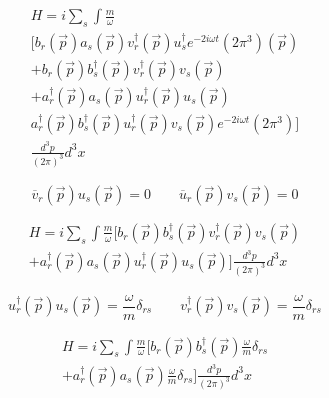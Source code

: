 \documentclass[a4]{article}
\begin{document}
    \begin{equation}
        \begin{aligned}
            H = i \sum_{s} \int \frac{m}{\omega} \\
        [b_r (\vec{p}) a_s (\vec{p}) v_r^{\dagger} (\vec{p}) u_s^{\dagger} e^{-2i \omega t} (2 \pi^3) (\vec{p}) \\
        + b_r (\vec{p}) b_s^{\dagger} (\vec{p}) v_r^{\dagger} (\vec{p}) v_s (\vec{p}) \\
        + a_r^{\dagger} (\vec{p}) a_s (\vec{p}) u_r^{\dagger} (\vec{p}) u_s (\vec{p}) \\
        a_r^{\dagger} (\vec{p}) b_s^{\dagger} (\vec{p}) u_r^{\dagger} (\vec{p}) v_s (\vec{p}) e^{-2i \omega t} (2 \pi^3)] \\
        \frac{d^{3} p}{(2 \pi)^3} d^3 x
        \end{aligned}
    \end{equation}

    \begin{equation}
        \overline{v}_r (\vec{p}) u_s (\vec{p}) = 0 \qquad \overline{u}_r (\vec{p}) v_s (\vec{p}) = 0
    \end{equation}

    \begin{equation}
        \begin{aligned}
            H = i \sum_{s} \int \frac{m}{\omega} [b_r (\vec{p}) b_s^{\dagger} (\vec{p}) v_r^{\dagger} (\vec{p}) v_s (\vec{p}) \\
        + a_r^{\dagger} (\vec{p}) a_s (\vec{p}) u_r^{\dagger} (\vec{p}) u_s (\vec{p})] \frac{d^{3} p}{(2 \pi)^3} d^3 x
        \end{aligned}
    \end{equation}

    \begin{equation}
        u_r^{\dagger} (\vec{p}) u_s (\vec{p}) = \frac{\omega}{m} \delta_{rs} \qquad v_r^{\dagger} (\vec{p}) v_s (\vec{p}) = \frac{\omega}{m} \delta_{rs}
    \end{equation}

    \begin{equation}
        \begin{aligned}
            H = i \sum_{s} \int \frac{m}{\omega} [b_r (\vec{p}) b_s^{\dagger} (\vec{p}) \frac{\omega}{m} \delta_{rs} \\
        + a_r^{\dagger} (\vec{p}) a_s (\vec{p}) \frac{\omega}{m} \delta_{rs}] \frac{d^{3} p}{(2 \pi)^3} d^3 x
        \end{aligned}
    \end{equation}
\end{document}
